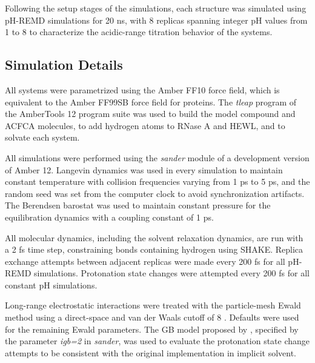 Following the setup stages of the simulations, each structure was simulated
using pH-REMD simulations for 20 ns, with 8 replicas spanning integer pH values
from 1 to 8 to characterize the acidic-range titration behavior of the systems.

\subsection{Simulation Details}

All systems were parametrized using the Amber FF10 force field, which is
equivalent to the Amber FF99SB force field for proteins.
\cite{Hornak_Proteins_2006_v65_p712} The \emph{tleap} program of the AmberTools
12 program suite was used to build the model compound and ACFCA molecules, to
add hydrogen atoms to RNase A and HEWL, and to solvate each system.

All simulations were performed using the \emph{sander} module of a development
version of Amber 12. \cite{AMBER12} Langevin dynamics was used in every
simulation to maintain constant temperature with collision frequencies varying
from 1 ps to 5 ps, and the random seed was set from
the computer clock to avoid synchronization artifacts.
\cite{Uberuaga_JChemPhys_2004_v120_p6363,
Sindhikara_JChemTheoryComput_2009_v5_p1624} The Berendsen barostat was used to
maintain constant pressure for the equilibration dynamics with a coupling
constant of 1 ps.

All molecular dynamics, including the solvent relaxation dynamics, are run with
a 2 fs time step, constraining bonds containing hydrogen using SHAKE.
\cite{Ryckaert_JComputPhys_1977_v23_p327, Miyamoto_JComputChem_1992_v13_p952}
Replica exchange attempts between adjacent replicas were made every 200 fs for
all pH-REMD simulations. Protonation state changes were attempted every 200 fs
for all constant pH simulations.

Long-range electrostatic interactions were treated with the particle-mesh Ewald
method \cite{Darden_JChemPhys_1993_v98_p10089,
Essmann_JChemPhys_1995_v103_p8577} using a direct-space and van der Waals cutoff
of 8 \text{\AA}. Defaults were used for the remaining Ewald parameters. The GB
model proposed by \citeauthor{Onufriev_Proteins_2004_v55_p383}, specified by the
parameter \emph{igb=2} in \emph{sander}, \cite{Onufriev_Proteins_2004_v55_p383}
was used to evaluate the protonation state change attempts to be consistent with
the original implementation in implicit solvent.
\cite{Mongan_JComputChem_2004_v25_p2038}

